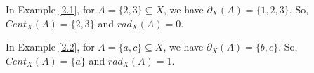 \documentclass[12pt]{amsart}
\newtheorem{theorem}[definition]{Theorem}
\begin{document}

In Example \ref{2.1}, for $A=\{2,3\}\subseteq X$, we have $\partial_{X}(A)=\{1,2,3\}$. So, $Cent_{X}(A)=\{2,3\}$ and $rad_{X}(A)=0$.\par 
In Example \ref{2.2},  for $A=\{a,c\}\subseteq X$, we have $\partial_{X}(A)=\{b,c\}$. So, $Cent_{X}(A)=\{a\}$ and $rad_{X}(A)=1$.\par 




\end{document}
